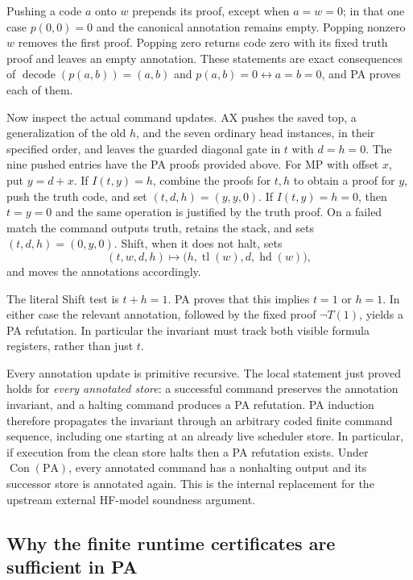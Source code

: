 Pushing a code $a$ onto $w$ prepends its proof, except when $a=w=0$;
in that one case $p(0,0)=0$ and the canonical annotation remains
empty. Popping nonzero $w$ removes the first proof. Popping zero
returns code zero with its fixed truth proof and leaves an empty
annotation. These statements are exact consequences of
$\operatorname{decode}(p(a,b))=(a,b)$ and
$p(a,b)=0\leftrightarrow a=b=0$, and PA proves each of them.

Now inspect the actual command updates.
AX pushes the saved top, a generalization of the old $h$, and the
seven ordinary head instances, in their specified order, and leaves
the guarded diagonal gate in $t$ with $d=h=0$.
The nine pushed entries have the PA proofs provided above.
For MP with offset $x$, put $y=d+x$.
If $I(t,y)=h$, combine the proofs for $t,h$ to obtain a proof for
$y$, push the truth code, and set $(t,d,h)=(y,y,0)$.
If $I(t,y)=h=0$, then $t=y=0$ and the same operation is justified
by the truth proof. On a failed match the command outputs truth,
retains the stack, and sets $(t,d,h)=(0,y,0)$.
Shift, when it does not halt, sets
\[
 (t,w,d,h)\longmapsto
   \bigl(h,\operatorname{tl}(w),d,\operatorname{hd}(w)\bigr),
\]
and moves the annotations accordingly.

The literal Shift test is $t+h=1$. PA proves that this implies
$t=1$ or $h=1$. In either case the relevant annotation, followed by
the fixed proof $\neg T(1)$, yields a PA refutation. In particular
the invariant must track both visible formula registers, rather
than just $t$.

Every annotation update is primitive recursive. The local statement
just proved holds for \emph{every annotated store}: a successful
command preserves the annotation invariant, and a halting command
produces a PA refutation. PA induction therefore propagates the
invariant through an arbitrary coded finite command sequence,
including one starting at an already live scheduler store.
In particular, if execution from the clean store halts then a PA
refutation exists. Under $\operatorname{Con}(\mathrm{PA})$, every
annotated command has a nonhalting output and its successor store
is annotated again. This is the internal replacement for the
upstream external HF-model soundness argument.

\subsection{Why the finite runtime certificates are sufficient in PA}

